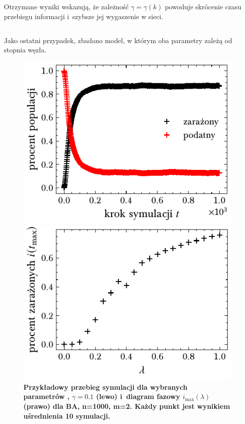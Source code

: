 \documentclass[13pt,a4paper]{article}
\begin{document}
Otrzymane wyniki wskazują, że zależność $\gamma=\gamma(k)$ powoduje skrócenie czasu przebiegu informacji i szybsze jej wygaszenie w sieci.


\subsection{\texorpdfstring{}{beta and gamma proportional to k}}

Jako ostatni przypadek, zbadano model, w którym oba parametry zależą od stopnia węzła.

\begin{figure}[ht!]
	\begin{minipage}[t]{0.49\textwidth}
		\centering
		\includegraphics[width=\textwidth]{../figures/both/ba_infected_vs_step.pdf}
	\end{minipage}
	\hspace{\fill}
	\begin{minipage}[t]{0.49\textwidth}
		\centering
		\includegraphics[width=\textwidth]{../figures/both/ba_infected_vs_ratio.pdf}
	\end{minipage}
	\caption{\centering\textbf{Przykładowy przebieg symulacji dla wybranych parametrów , $\gamma=0.1$ (lewo) i diagram fazowy $i_{\max}(\lambda)$ (prawo) dla BA, n=1000, m=2. Każdy punkt jest wynikiem uśrednienia 10 symulacji.}}
\end{figure}
\end{document}
